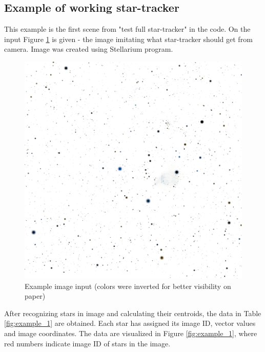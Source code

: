 \documentclass[12pt,a4paper,twoside]{article}
\begin{document}
\subsection{Example of working star-tracker}

This example is the first scene from "test full star-tracker" in the code. On the input Figure \ref{fig:example_0} is given - the image imitating what star-tracker should get from camera. Image was created using Stellarium program.

\begin{figure}[!htbp]
\includegraphics[scale=0.4]{example_0.png}
\centering
\caption[Example image input]{Example image input (colors were inverted for better visibility on paper)}
\label{fig:example_0}
\end{figure}

After recognizing stars in image and calculating their centroids, the data in Table \ref{fig:example_1} are obtained. Each star has assigned its image ID, vector values and image coordinates. 
The data are visualized in Figure \ref{fig:example_1}, where red numbers indicate image ID of stars in the image.
\end{document}
